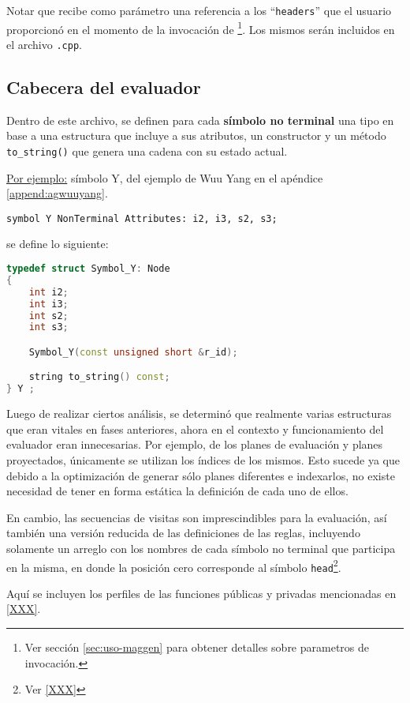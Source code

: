 Notar que recibe como parámetro una referencia a los ``\texttt{headers}'' que el usuario proporcionó en el momento de la invocación de \maggen \footnote{Ver sección \ref{sec:uso-maggen} para obtener detalles sobre parametros de invocación.}. Los mismos serán incluidos en el archivo \texttt{.cpp}.

\subsection{Cabecera del evaluador}

Dentro de este archivo, se definen para cada \textbf{símbolo no terminal} una tipo en base a una estructura que incluye a sus atributos, un constructor y un método \texttt{to\_string()} que genera una cadena con su estado actual.

\underline{Por ejemplo:} símbolo Y, del ejemplo de Wuu Yang en el apéndice \ref{append:agwuuyang}.
\begin{center}\texttt{symbol Y  NonTerminal Attributes: i2, i3, s2, s3;}\end{center}
se define lo siguiente:
\begin{lstlisting}[language=C++, basicstyle=\scriptsize, columns=fullflexible, linewidth=7cm]
typedef struct Symbol_Y: Node
{
    int i2;
    int i3;
    int s2;
    int s3;

    Symbol_Y(const unsigned short &r_id);

    string to_string() const;
} Y ;
\end{lstlisting}

Luego de realizar ciertos análisis, se determinó que realmente varias estructuras que eran vitales en fases anteriores, ahora en el contexto y funcionamiento del evaluador eran innecesarias. Por ejemplo, de los planes de evaluación y planes proyectados, únicamente se utilizan los índices de los mismos. Esto sucede ya que debido a la optimización de generar sólo planes diferentes e indexarlos, no existe necesidad de tener en forma estática la definición de cada uno de ellos.

En cambio, las secuencias de visitas son imprescindibles para la evaluación, así también una versión reducida de las definiciones de las reglas, incluyendo solamente un arreglo con los nombres de cada símbolo no terminal que participa en la misma, en donde la posición cero corresponde al símbolo \texttt{head}\footnote{Ver \ref{XXX}}.

Aquí se incluyen los perfiles de las funciones públicas y privadas mencionadas en \ref{XXX}.

